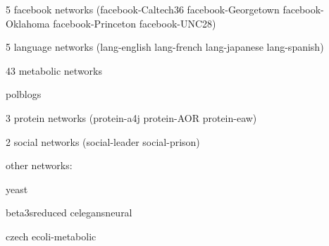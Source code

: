5 facebook networks (facebook-Caltech36 facebook-Georgetown facebook-Oklahoma
facebook-Princeton facebook-UNC28)

5 language networks (lang-english  lang-french lang-japanese lang-spanish)

43 metabolic networks

polblogs

3 protein networks (protein-a4j protein-AOR protein-eaw)

2 social networks (social-leader social-prison)

other networks:

yeast

beta3sreduced
celegansneural

czech
ecoli-metabolic
